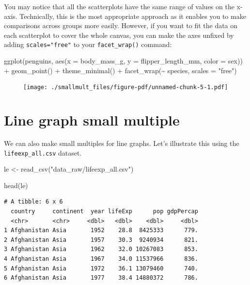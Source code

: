 \documentclass[
  letterpaper,
  DIV=11,
  numbers=noendperiod]{scrreprt}
\newenvironment{Shaded}{\begin{snugshade}}{\end{snugshade}}
\newcommand{\AttributeTok}[1]{\textcolor[rgb]{0.40,0.45,0.13}{#1}}
\newcommand{\FunctionTok}[1]{\textcolor[rgb]{0.28,0.35,0.67}{#1}}
\newcommand{\NormalTok}[1]{\textcolor[rgb]{0.00,0.23,0.31}{#1}}
\newcommand{\OtherTok}[1]{\textcolor[rgb]{0.00,0.23,0.31}{#1}}
\newcommand{\SpecialCharTok}[1]{\textcolor[rgb]{0.37,0.37,0.37}{#1}}
\newcommand{\StringTok}[1]{\textcolor[rgb]{0.13,0.47,0.30}{#1}}
\begin{document}
You may notice that all the scatterplots have the same range of values
on the x-axis. Technically, this is the most appropriate approach as it
enables you to make comparisons across groups more easily. However, if
you want to fit the data on each scatterplot to cover the whole canvas,
you can make the axes unfixed by adding \texttt{scales="free"} to your
\texttt{facet\_wrap()} command:

\begin{Shaded}
\begin{Highlighting}[]
\FunctionTok{ggplot}\NormalTok{(penguins, }\FunctionTok{aes}\NormalTok{(}\AttributeTok{x =}\NormalTok{ body\_mass\_g,  }\AttributeTok{y =}\NormalTok{ flipper\_length\_mm, }\AttributeTok{color =}\NormalTok{ sex)) }\SpecialCharTok{+} 
  \FunctionTok{geom\_point}\NormalTok{() }\SpecialCharTok{+}
  \FunctionTok{theme\_minimal}\NormalTok{() }\SpecialCharTok{+}
  \FunctionTok{facet\_wrap}\NormalTok{(}\SpecialCharTok{\textasciitilde{}}\NormalTok{ species, }\AttributeTok{scales =} \StringTok{"free"}\NormalTok{)}
\end{Highlighting}
\end{Shaded}

\begin{figure}[H]

{\centering \texttt{[image: ./smallmult\_files/figure-pdf/unnamed-chunk-5-1.pdf]}

}

\end{figure}

\hypertarget{line-graph-small-multiple}{%
\section{\texorpdfstring{\textbf{Line graph small
multiple}}{Line graph small multiple}}\label{line-graph-small-multiple}}

We can also make small multiples for line graphs. Let's illustrate this
using the \texttt{lifeexp\_all.csv} dataset.

\begin{Shaded}
\begin{Highlighting}[]
\NormalTok{le }\OtherTok{\textless{}{-}} \FunctionTok{read\_csv}\NormalTok{(}\StringTok{"data\_raw/lifeexp\_all.csv"}\NormalTok{)}

\FunctionTok{head}\NormalTok{(le)}
\end{Highlighting}
\end{Shaded}

\begin{verbatim}
# A tibble: 6 x 6
  country     continent  year lifeExp      pop gdpPercap
  <chr>       <chr>     <dbl>   <dbl>    <dbl>     <dbl>
1 Afghanistan Asia       1952    28.8  8425333      779.
2 Afghanistan Asia       1957    30.3  9240934      821.
3 Afghanistan Asia       1962    32.0 10267083      853.
4 Afghanistan Asia       1967    34.0 11537966      836.
5 Afghanistan Asia       1972    36.1 13079460      740.
6 Afghanistan Asia       1977    38.4 14880372      786.
\end{verbatim}
\end{document}
